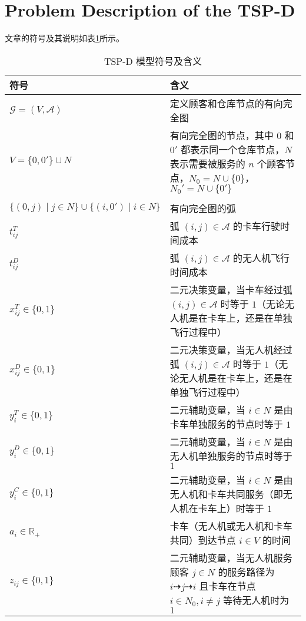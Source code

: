 \documentclass[fontset=none]{ctexart}
\begin{document}
\section{Problem Description of the TSP-D}
文章的符号及其说明如表\cref{tab:tspd-sign-meaning}所示。

\begin{table}[!htbp]
    \begin{threeparttable}
    \centering
    \caption{TSP-D 模型符号及含义}
    \label{tab:tspd-sign-meaning}
    \begin{tabularx}{\textwidth}{lX}
        \toprule[1pt] %
        符号 & 含义 \\
        \midrule[0.75pt] %
        $\mathcal{G} = (V, \mathcal{A})$ & 定义顾客和仓库节点的有向完全图 \\ 
        $V = \{0, 0'\} \cup N$ & 有向完全图的节点，其中 $0$ 和 $0'$ 都表示同一个仓库节点，$N$ 表示需要被服务的 $n$ 个顾客节点，$N_0 = N \cup \{0\}$，$N_0' = N \cup \{0'\}$ \\ 
        \makecell[l]{$\mathcal{A} = \{(i, j) \mid i, j \in N: i \neq j\} \cup$\\
        $\{(0,j) \mid j \in N \} \cup \{(i, 0')\mid i \in N\}$} & 有向完全图的弧 \\ 
        $t_{ij}^T$ & 弧 $(i, j) \in \mathcal{A}$ 的卡车行驶时间成本 \\
        $t_{ij}^D$ & 弧 $(i, j) \in \mathcal{A}$ 的无人机飞行时间成本\hyperlink{tab:tspd-item-1}{\tnote{a}} \\
        $x_{ij}^T \in \{0, 1\}$ & 二元决策变量，当卡车经过弧 $(i, j) \in \mathcal{A}$ 时等于 $1$（无论无人机是在卡车上，还是在单独飞行过程中） \\ 
        $x_{ij}^D \in \{0, 1\}$ & 二元决策变量，当无人机经过弧 $(i, j) \in \mathcal{A}$ 时等于 $1$（无论无人机是在卡车上，还是在单独飞行过程中） \\ 
        $y_i^T \in \{0, 1\}$ & 二元辅助变量，当 $i \in N$ 是由卡车单独服务的节点时等于 $1$ \\  
        $y_i^D \in \{0, 1\}$ & 二元辅助变量，当 $i \in N$ 是由无人机单独服务的节点时等于 $1$ \\  
        $y_i^C \in \{0, 1\}$ & 二元辅助变量，当 $i \in N$ 是由无人机和卡车共同服务（即无人机在卡车上）时等于 $1$ \\ 
        $a_i \in \mathbb{R}_+$ & 卡车（无人机或无人机和卡车共同）到达节点 $i \in V$ 的时间 \\ 
        $z_{ij} \in \{0, 1\}$ & 二元辅助变量，当无人机服务顾客 $j \in N$ 的服务路径为 $i \dashrightarrow j \dashrightarrow i$ 且卡车在节点 $i \in N_0, i \neq j$ 等待无人机时为 $1$ \\ 

\end{tabularx}
\end{threeparttable}
\end{table}
\end{document}
